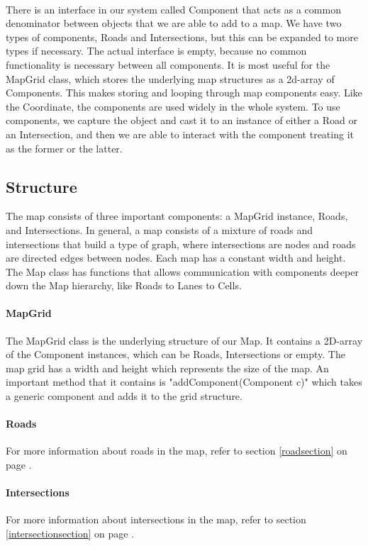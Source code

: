 \documentclass[a4paper,11pt,titlepage]{article}
\begin{document}
\paragraph{}
There is an interface in our system called Component that acts as a common denominator between objects that we are able to add to a map. We have two types of components, Roads and Intersections, but this can be expanded to more types if necessary. The actual interface is empty, because no common functionality is necessary between all components. It is most useful for the MapGrid class, which stores the underlying map structures as a 2d-array of Components. This makes storing and looping through map components easy. Like the Coordinate, the components are used widely in the whole system. To use components, we capture the object and cast it to an instance of either a Road or an Intersection, and then we are able to interact with the component treating it as the former or the latter. 
\subsection{Structure}
The map consists of three important components: a MapGrid instance, Roads, and Intersections. In general, a map consists of a mixture of roads and intersections that build a type of graph, where intersections are nodes and roads are directed edges between nodes. Each map has a constant width and height. The Map class has functions that allows communication with components deeper down the Map hierarchy, like Roads to Lanes to Cells. 
\paragraph{MapGrid}
The MapGrid class is the underlying structure of our Map. It contains a 2D-array of the Component instances, which can be Roads, Intersections or empty. The map grid has a width and height which represents the size of the map. An important method that it contains is "addComponent(Component c)" which takes a generic component and adds it to the grid structure.
\paragraph{Roads} For more information about roads in the map, refer to section \ref{roadsection} on page \pageref{roadsection}.
\paragraph{Intersections} For more information about intersections in the map, refer to section \ref{intersectionsection} on page \pageref{intersectionsection}.
\end{document}
